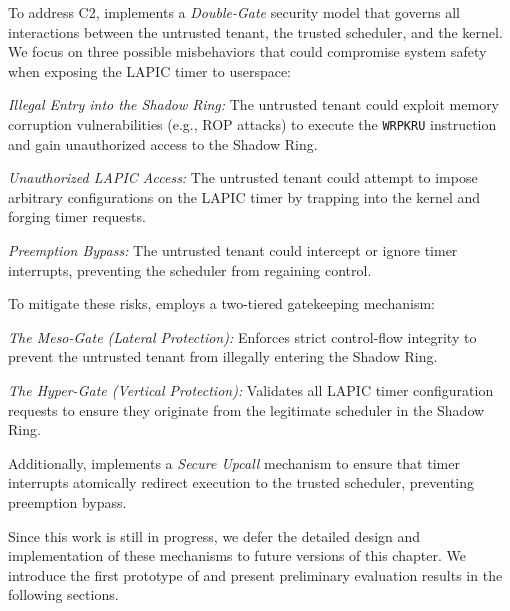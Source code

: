 To address C2,  implements a \emph{Double-Gate} security model that governs all interactions between the untrusted tenant, the trusted scheduler, and the kernel.
We focus on three possible misbehaviors that could compromise system safety when exposing the LAPIC timer to userspace:
\begin{enumerate*}[leftmargin=*,label=(\arabic*)]
\item \textit{Illegal Entry into the Shadow Ring:} The untrusted tenant could exploit memory corruption vulnerabilities (e.g., ROP attacks) to execute the \texttt{WRPKRU} instruction and gain unauthorized access to the Shadow Ring.
\item \textit{Unauthorized LAPIC Access:} The untrusted tenant could attempt to impose arbitrary configurations on the LAPIC timer by trapping into the kernel and forging timer requests.
\item \textit{Preemption Bypass:} The untrusted tenant could intercept or ignore timer interrupts, preventing the scheduler from regaining control.
\end{enumerate*}
To mitigate these risks,  employs a two-tiered gatekeeping mechanism:
\begin{enumerate*}[leftmargin=*,label=(\roman*)]
\item \emph{The Meso-Gate (Lateral Protection):} Enforces strict control-flow integrity to prevent the untrusted tenant from illegally entering the Shadow Ring.
\item \emph{The Hyper-Gate (Vertical Protection):} Validates all LAPIC timer configuration requests to ensure they originate from the legitimate scheduler in the Shadow Ring.
\end{enumerate*}
Additionally,  implements a \emph{Secure Upcall} mechanism to ensure that timer interrupts atomically redirect execution to the trusted scheduler, preventing preemption bypass.

Since this work is still in progress, we defer the detailed design and implementation of these mechanisms to future versions of this chapter.
We introduce the first prototype of \sysname and present preliminary evaluation results in the following sections.
